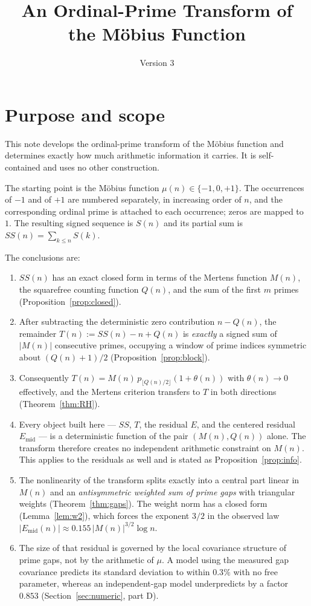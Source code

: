 \documentclass[11pt]{amsart}
\title{An Ordinal-Prime Transform of the M\"obius Function}
\author{}
\date{Version 3}
\theoremstyle{definition}
\newcommand{\mob}{\mu}
\newcommand{\Mert}{M}
\newcommand{\Sq}{Q}
\begin{document}
\maketitle
\tableofcontents

\section{Purpose and scope}

This note develops the ordinal-prime transform of the M\"obius function and
determines exactly how much arithmetic information it carries. It is
self-contained and uses no other construction.

The starting point is the M\"obius function $\mob(n)\in\{-1,0,+1\}$. The
occurrences of $-1$ and of $+1$ are numbered separately, in increasing order of
$n$, and the corresponding ordinal prime is attached to each occurrence; zeros
are mapped to $1$. The resulting signed sequence is $S(n)$ and its partial sum
is $SS(n)=\sum_{k\le n}S(k)$.

The conclusions are:

\begin{enumerate}[label=(\roman*)]
\item $SS(n)$ has an exact closed form in terms of the Mertens function
$\Mert(n)$, the squarefree counting function $\Sq(n)$, and the sum of the first
$m$ primes (Proposition~\ref{prop:closed}).
\item After subtracting the deterministic zero contribution $n-\Sq(n)$, the
remainder $T(n):=SS(n)-n+\Sq(n)$ is \emph{exactly} a signed sum of $|\Mert(n)|$
consecutive primes, occupying a window of prime indices symmetric about
$(\Sq(n)+1)/2$ (Proposition~\ref{prop:block}).
\item Consequently $T(n)=\Mert(n)\,p_{\lfloor \Sq(n)/2\rfloor}(1+\theta(n))$
with $\theta(n)\to0$ effectively, and the Mertens criterion transfers to $T$ in
both directions (Theorem~\ref{thm:RH}).
\item Every object built here --- $SS$, $T$, the residual $E$, and the centered
residual $E_{\mathrm{mid}}$ --- is a deterministic function of the pair
$(\Mert(n),\Sq(n))$ alone. The transform therefore creates no independent
arithmetic constraint on $\Mert(n)$. This applies to the residuals as well and
is stated as Proposition~\ref{prop:info}.
\item The nonlinearity of the transform splits exactly into a central part
linear in $\Mert(n)$ and an \emph{antisymmetric weighted sum of prime gaps}
with triangular weights (Theorem~\ref{thm:gaps}). The weight norm has a closed
form (Lemma~\ref{lem:w2}), which forces the exponent $3/2$ in the observed law
$|E_{\mathrm{mid}}(n)|\approx0.155\,|\Mert(n)|^{3/2}\log n$.
\item The size of that residual is governed by the local covariance structure of
prime gaps, not by the arithmetic of $\mob$. A model using the measured gap
covariance predicts its standard deviation to within $0.3\%$ with no free
parameter, whereas an independent-gap model underpredicts by a factor $0.853$
(Section~\ref{sec:numeric}, part D).
\end{enumerate}
\end{document}
